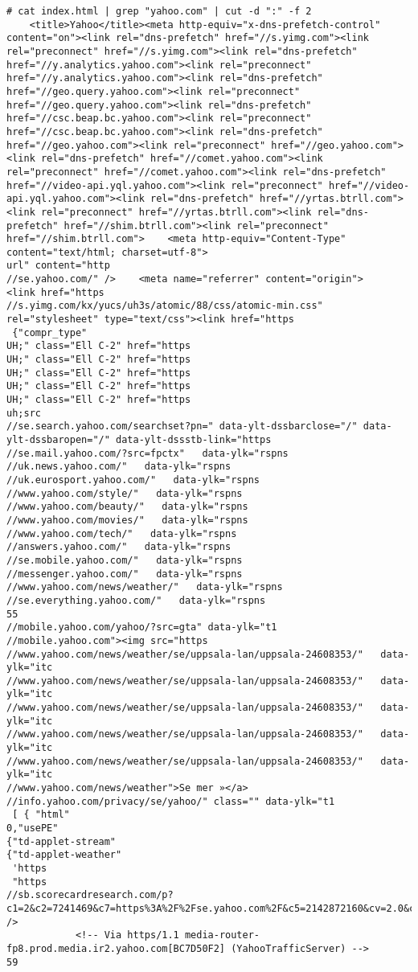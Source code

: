\begin{verbatim}
# cat index.html | grep "yahoo.com" | cut -d ":" -f 2
    <title>Yahoo</title><meta http-equiv="x-dns-prefetch-control" content="on"><link rel="dns-prefetch" href="//s.yimg.com"><link rel="preconnect" href="//s.yimg.com"><link rel="dns-prefetch" href="//y.analytics.yahoo.com"><link rel="preconnect" href="//y.analytics.yahoo.com"><link rel="dns-prefetch" href="//geo.query.yahoo.com"><link rel="preconnect" href="//geo.query.yahoo.com"><link rel="dns-prefetch" href="//csc.beap.bc.yahoo.com"><link rel="preconnect" href="//csc.beap.bc.yahoo.com"><link rel="dns-prefetch" href="//geo.yahoo.com"><link rel="preconnect" href="//geo.yahoo.com"><link rel="dns-prefetch" href="//comet.yahoo.com"><link rel="preconnect" href="//comet.yahoo.com"><link rel="dns-prefetch" href="//video-api.yql.yahoo.com"><link rel="preconnect" href="//video-api.yql.yahoo.com"><link rel="dns-prefetch" href="//yrtas.btrll.com"><link rel="preconnect" href="//yrtas.btrll.com"><link rel="dns-prefetch" href="//shim.btrll.com"><link rel="preconnect" href="//shim.btrll.com">    <meta http-equiv="Content-Type" content="text/html; charset=utf-8">
url" content="http
//se.yahoo.com/" />    <meta name="referrer" content="origin">        <link href="https
//s.yimg.com/kx/yucs/uh3s/atomic/88/css/atomic-min.css" rel="stylesheet" type="text/css"><link href="https
 {"compr_type"
UH;" class="Ell C-2" href="https
UH;" class="Ell C-2" href="https
UH;" class="Ell C-2" href="https
UH;" class="Ell C-2" href="https
UH;" class="Ell C-2" href="https
uh;src
//se.search.yahoo.com/searchset?pn=" data-ylt-dssbarclose="/" data-ylt-dssbaropen="/" data-ylt-dssstb-link="https
//se.mail.yahoo.com/?src=fpctx"   data-ylk="rspns
//uk.news.yahoo.com/"   data-ylk="rspns
//uk.eurosport.yahoo.com/"   data-ylk="rspns
//www.yahoo.com/style/"   data-ylk="rspns
//www.yahoo.com/beauty/"   data-ylk="rspns
//www.yahoo.com/movies/"   data-ylk="rspns
//www.yahoo.com/tech/"   data-ylk="rspns
//answers.yahoo.com/"   data-ylk="rspns
//se.mobile.yahoo.com/"   data-ylk="rspns
//messenger.yahoo.com/"   data-ylk="rspns
//www.yahoo.com/news/weather/"   data-ylk="rspns
//se.everything.yahoo.com/"   data-ylk="rspns
55
//mobile.yahoo.com/yahoo/?src=gta" data-ylk="t1
//mobile.yahoo.com"><img src="https
//www.yahoo.com/news/weather/se/uppsala-lan/uppsala-24608353/"   data-ylk="itc
//www.yahoo.com/news/weather/se/uppsala-lan/uppsala-24608353/"   data-ylk="itc
//www.yahoo.com/news/weather/se/uppsala-lan/uppsala-24608353/"   data-ylk="itc
//www.yahoo.com/news/weather/se/uppsala-lan/uppsala-24608353/"   data-ylk="itc
//www.yahoo.com/news/weather/se/uppsala-lan/uppsala-24608353/"   data-ylk="itc
//www.yahoo.com/news/weather">Se mer »</a>
//info.yahoo.com/privacy/se/yahoo/" class="" data-ylk="t1
 [ { "html"
0,"usePE"
{"td-applet-stream"
{"td-applet-weather"
 'https
 "https
//sb.scorecardresearch.com/p?c1=2&c2=7241469&c7=https%3A%2F%2Fse.yahoo.com%2F&c5=2142872160&cv=2.0&cj=1" />
            <!-- Via https/1.1 media-router-fp8.prod.media.ir2.yahoo.com[BC7D50F2] (YahooTrafficServer) -->
59
\end{verbatim}
